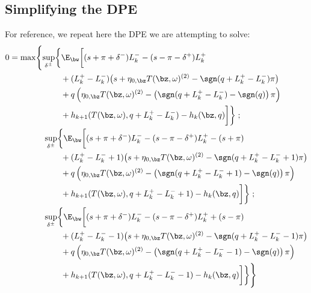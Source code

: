 \documentclass[12pt]{article}
\begin{document}
\subsection*{Simplifying the DPE}
For reference, we repeat here the DPE we are attempting to solve:
\begin{equation}
\begin{split}
0 & = \max \Biggl\lbrace 
\sup_{\delta^\pm} \biggl\lbrace \E_{\bw} \biggl[
(s + \pi + \delta^-)L_k^- - (s - \pi - \delta^+)L_k^+ \\
& \hphantom{\sup_{\bu} \biggl\lbrace \E_{\bw} \biggl[ {}+{}} + (L_k^+ - L_k^-) \bigl( s + \eta_{0,\bz} T(\bz, \omega)^{(2)}  -\sgn( q + L_k^+ - L_k^-)\pi   \bigr) \\
& \hphantom{\sup_{\bu} \biggl\lbrace \E_{\bw} \biggl[ {}+{}} + q\left( \eta_{0,\bz} T(\bz, \omega)^{(2)}  -\left( \sgn( q + L_k^+ - L_k^-) - \sgn(q) \right) \pi \right) \\
& \hphantom{\sup_{\bu} \biggl\lbrace \E_{\bw} \biggl[ {}+{}} + h_{k+1}(T(\bz,\omega), q + L_k^+ - L_k^- ) -  h_k(\bz,q) \biggr] \biggr\rbrace \; ;\\
& \hphantom{{}={} \max \biggl\lbrace } \sup_{\delta^\pm} \biggl\lbrace \E_{\bw} \biggl[
(s + \pi + \delta^-)L_k^- - (s - \pi - \delta^+)L_k^+ - (s + \pi)\\
& \hphantom{\sup_{\bu} \biggl\lbrace \E_{\bw} \biggl[ {}+{}} + (L_k^+ - L_k^- +1) \bigl( s + \eta_{0,\bz} T(\bz, \omega)^{(2)}  -\sgn( q + L_k^+ - L_k^- +1)\pi   \bigr) \\
& \hphantom{\sup_{\bu} \biggl\lbrace \E_{\bw} \biggl[ {}+{}} + q\left( \eta_{0,\bz} T(\bz, \omega)^{(2)}  -\left( \sgn( q + L_k^+ - L_k^- +1) - \sgn(q) \right) \pi \right) \\
& \hphantom{\sup_{\bu} \biggl\lbrace \E_{\bw} \biggl[ {}+{}} + h_{k+1}(T(\bz,\omega), q + L_k^+ - L_k^- + 1) -  h_k(\bz,q) \biggr] \biggr\rbrace \; ; \\
& \hphantom{{}={} \max \biggl\lbrace } \sup_{\delta^\pm} \biggl\lbrace \E_{\bw} \biggl[
(s + \pi + \delta^-)L_k^- - (s - \pi - \delta^+)L_k^+ + (s - \pi) \\
& \hphantom{\sup_{\bu} \biggl\lbrace \E_{\bw} \biggl[ {}+{}} + (L_k^+ - L_k^- -1) \bigl( s + \eta_{0,\bz} T(\bz, \omega)^{(2)}  -\sgn( q + L_k^+ - L_k^- -1)\pi   \bigr) \\
& \hphantom{\sup_{\bu} \biggl\lbrace \E_{\bw} \biggl[ {}+{}} + q\left( \eta_{0,\bz} T(\bz, \omega)^{(2)}  -\left( \sgn( q + L_k^+ - L_k^- -1) - \sgn(q) \right) \pi \right) \\
& \hphantom{\sup_{\bu} \biggl\lbrace \E_{\bw} \biggl[ {}+{}} + h_{k+1}(T(\bz,\omega), q + L_k^+ - L_k^- -1) -  h_k(\bz,q) \biggr] \biggr\rbrace  \Biggr\rbrace
\end{split}
\end{equation}
\end{document}
